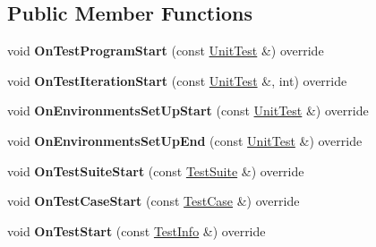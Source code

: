 \subsection*{Public Member Functions}
\begin{DoxyCompactItemize}
\item 
\mbox{\label{classtesting_1_1EmptyTestEventListener_ac3f5033fcd82080edb45f546ce9854fe}} 
void {\bfseries On\+Test\+Program\+Start} (const \mbox{\hyperlink{classtesting_1_1UnitTest}{Unit\+Test}} \&) override
\item 
\mbox{\label{classtesting_1_1EmptyTestEventListener_a31edf103561e8b4d747656bc2d927661}} 
void {\bfseries On\+Test\+Iteration\+Start} (const \mbox{\hyperlink{classtesting_1_1UnitTest}{Unit\+Test}} \&, int) override
\item 
\mbox{\label{classtesting_1_1EmptyTestEventListener_a6e498ae763ac8c1a46bd861e0b7ff3f5}} 
void {\bfseries On\+Environments\+Set\+Up\+Start} (const \mbox{\hyperlink{classtesting_1_1UnitTest}{Unit\+Test}} \&) override
\item 
\mbox{\label{classtesting_1_1EmptyTestEventListener_a9b4e781c0b38065a55c2fd163724ba69}} 
void {\bfseries On\+Environments\+Set\+Up\+End} (const \mbox{\hyperlink{classtesting_1_1UnitTest}{Unit\+Test}} \&) override
\item 
\mbox{\label{classtesting_1_1EmptyTestEventListener_a1e32e4bd4857822b6b50e6900aa5c651}} 
void {\bfseries On\+Test\+Suite\+Start} (const \mbox{\hyperlink{classtesting_1_1TestSuite}{Test\+Suite}} \&) override
\item 
\mbox{\label{classtesting_1_1EmptyTestEventListener_a7f9a84967fde01000b7a56e9e84b6052}} 
void {\bfseries On\+Test\+Case\+Start} (const \mbox{\hyperlink{classtesting_1_1TestSuite}{Test\+Case}} \&) override
\item 
\mbox{\label{classtesting_1_1EmptyTestEventListener_a1d8c7f3f1f92826f668edae1bc5aadf4}} 
void {\bfseries On\+Test\+Start} (const \mbox{\hyperlink{classtesting_1_1TestInfo}{Test\+Info}} \&) override

\end{DoxyCompactItemize}
